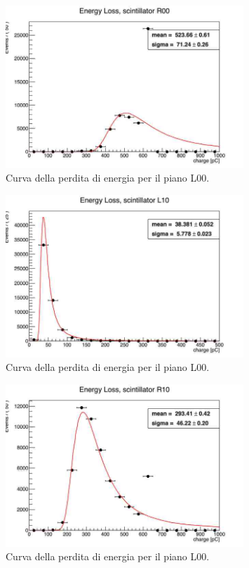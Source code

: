 \begin{figure}[H]
  \centering
  \includegraphics[width=0.8\textwidth]{plots/energy_R00.jpg}
  \caption{Curva della perdita di energia per il piano L00.}
  \label{fig:r00}
\end{figure}

\begin{figure}[H]
  \centering
  \includegraphics[width=0.8\textwidth]{plots/energy_L10.jpg}
  \caption{Curva della perdita di energia per il piano L00.}
  \label{fig:l10}
\end{figure}

\begin{figure}[H]
  \centering
  \includegraphics[width=0.8\textwidth]{plots/energy_R10.jpg}
  \caption{Curva della perdita di energia per il piano L00.}
  \label{fig:r10}
\end{figure}

